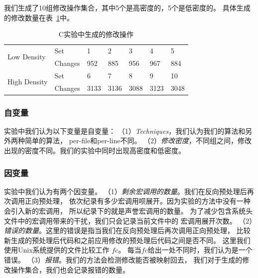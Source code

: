 我们生成了10组修改操作集合，其中5个是高密度的，5个是低密度的。
具体生成的修改数量在表~\ref{tbl:changes}中。
\begin{table}[htbp]
\caption{C实验中生成的修改操作}\label{tbl:changes}
\centering
\begin{tabular}{|l|l|lllll|}
  \hline
  \multirow{2}{2cm}{Low Density} & Set & 1 & 2 & 3 & 4 & 5  \\
  \cline{2-7}
                                 & Changes & 952 & 885 & 956 & 967 & 884 \\
  \hline
  \multirow{2}{2cm}{High Density} & Set & 6 & 7 & 8 & 9 & 10 \\
  \cline{2-7}
                                 & Changes & 3133 & 3136 & 3088 & 3123 & 3048\\
  \hline
\end{tabular}
\end{table}

\subsubsection{自变量}
实验中我们认为以下变量是自变量：
（1）\emph{Techniques}，我们认为我们的算法和另外两种简单的算法，
per-file和per-line不同。
（2）\emph{修改密度}，不同组之间，修改出现的密度不同。我们的实验中同时出现高密度和低密度。

\subsubsection{因变量}
实验中我们认为有两个因变量。
（1）\emph{剩余宏调用的数量}。我们在反向预处理后再次调用正向预处理，
  依次纪录有多少宏调用呗展开。因为实验的方法中没有一种会引入新的宏调用，
  所以纪录下的就是声誉宏调用的数量。
  为了减少包含系统头文件中的宏调用带来的干扰，我们只会记录当前文件中的
  宏调用展开次数。
（2）\emph{错误的数量}。这里的错误是指当我们在反向预处理后再次调用正向预处理，
  比较新生成的预处理后代码和之前应用修改的预处理后代码之间是否不同。
  这里我们使用Unix系统提供的文件比较工作 $fc$。
  每当$fc$给出一处不同时，我们认为是一个错误。
（3）\emph{报错}。我们的方法会检测修改能否被映射回去，
我们对于生成的修改操作集合，我们也会记录报错的数量。


